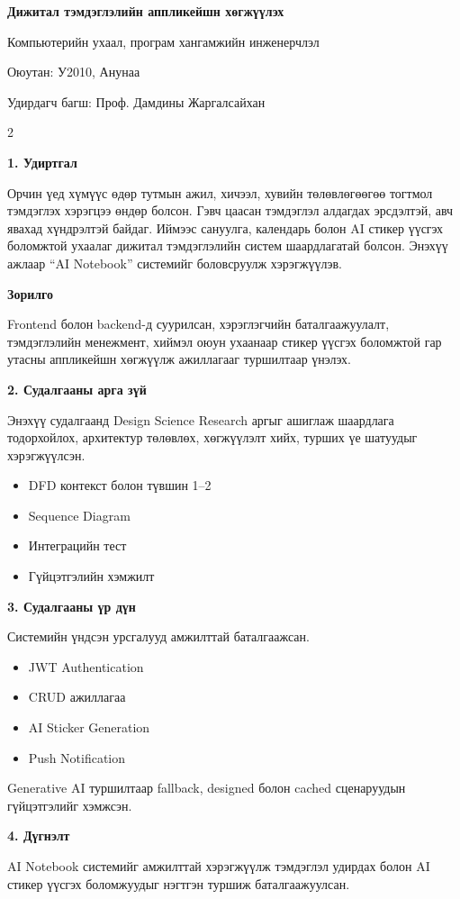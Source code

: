 \documentclass[7pt]{article}
\def\titlename{Дижитал тэмдэглэлийн аппликейшн хөгжүүлэх}
\def\departmentname{Компьютерийн ухаал, програм хангамжийн инженерчлэл}
\def\studentID{У2010}
\def\authorShort{Анунаа}
\def\supervisorname{Проф. Дамдины Жаргалсайхан}
\begin{document}
\pagestyle{empty}
\thispagestyle{plain}

\begin{center}
{\large\bfseries \titlename}
\end{center}

{\tiny
\departmentname

Оюутан: \studentID, \authorShort

Удирдагч багш: \supervisorname
}

\setlength{\columnsep}{2mm}

\begin{multicols}{2}

\tiny

\textbf{1. Удиртгал}

Орчин үед хүмүүс өдөр тутмын ажил, хичээл, хувийн төлөвлөгөөгөө тогтмол тэмдэглэх хэрэгцээ өндөр болсон. Гэвч цаасан тэмдэглэл алдагдах эрсдэлтэй, авч явахад хүндрэлтэй байдаг. Иймээс сануулга, календарь болон AI стикер үүсгэх боломжтой ухаалаг дижитал тэмдэглэлийн систем шаардлагатай болсон. Энэхүү ажлаар ``AI Notebook'' системийг боловсруулж хэрэгжүүлэв.

\textbf{Зорилго}

Frontend болон backend-д суурилсан, хэрэглэгчийн баталгаажуулалт, тэмдэглэлийн менежмент, хиймэл оюун ухаанаар стикер үүсгэх боломжтой гар утасны аппликейшн хөгжүүлж ажиллагааг туршилтаар үнэлэх.

\textbf{2. Судалгааны арга зүй}

Энэхүү судалгаанд Design Science Research аргыг ашиглаж шаардлага тодорхойлох, архитектур төлөвлөх, хөгжүүлэлт хийх, турших үе шатуудыг хэрэгжүүлсэн.

\begin{itemize}
\item DFD контекст болон түвшин 1--2
\item Sequence Diagram
\item Интеграцийн тест
\item Гүйцэтгэлийн хэмжилт
\end{itemize}

\textbf{3. Судалгааны үр дүн}

Системийн үндсэн урсгалууд амжилттай баталгаажсан.

\begin{itemize}
\item JWT Authentication
\item CRUD ажиллагаа
\item AI Sticker Generation
\item Push Notification
\end{itemize}

Generative AI туршилтаар fallback, designed болон cached сценаруудын гүйцэтгэлийг хэмжсэн.

\textbf{4. Дүгнэлт}

AI Notebook системийг амжилттай хэрэгжүүлж тэмдэглэл удирдах болон AI стикер үүсгэх боломжуудыг нэгтгэн туршиж баталгаажуулсан.

\end{multicols}
\end{document}
